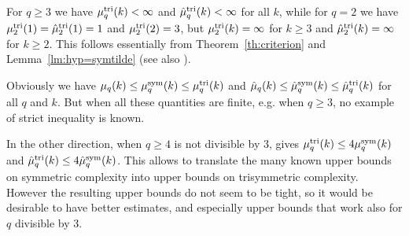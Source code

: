 \documentclass[11pt]{article}
\begin{document}
For $q\geq3$ we have $\mu^{\textrm{tri}}_q(k)<\infty$ and $\hat\mu^{\textrm{tri}}_q(k)<\infty$ for all $k$,
while for $q=2$ we have $\mu^{\textrm{tri}}_2(1)=\hat\mu^{\textrm{tri}}_2(1)=1$ and $\mu^{\textrm{tri}}_2(2)=3$,
but $\mu^{\textrm{tri}}_2(k)=\infty$ for $k\geq3$ and $\hat\mu^{\textrm{tri}}_2(k)=\infty$ for $k\geq2$.
This follows essentially from Theorem~\ref{th:criterion} and Lemma~\ref{lm:hyp=symtilde} (see also \cite[Prop.~A.14]{Randriam15}).

Obviously we have $\mu_q(k)\leq\mu^{\textrm{sym}}_q(k)\leq\mu^{\textrm{tri}}_q(k)$ and $\hat\mu_q(k)\leq\hat\mu^{\textrm{sym}}_q(k)\leq\hat\mu^{\textrm{tri}}_q(k)$ for all $q$ and $k$.
But when all these quantities are finite, e.g. when $q\geq3$, no example of strict inequality is known.

In the other direction, when $q\geq4$ is not divisible by $3$, \cite[Thm.~2]{SL84} gives $\mu^{\textrm{tri}}_q(k)\leq 4\mu^{\textrm{sym}}_q(k)$ and $\hat\mu^{\textrm{tri}}_q(k)\leq 4\hat\mu^{\textrm{sym}}_q(k)$.
This allows to translate the many known upper bounds on symmetric complexity \cite{BCPRRR19}
into upper bounds on trisymmetric complexity.
However the resulting upper bounds do not seem to be tight, so it would be desirable to have better estimates, and especially upper bounds that work also for $q$ divisible by $3$.



\end{document}

